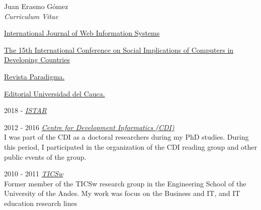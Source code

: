 \documentclass[10pt]{article}
\newenvironment{subbulletlist}{%
  \begin{list}{\labelitemii}{%
      \setlength{\topsep}{\itemsep}\setlength{\parskip}{\parsep}%
    }%
  }%
  { \end{list} }
\begin{document}
\begin{cv}{Juan Erasmo Gómez\\{\large \itshape Curriculum Vitae}}
  \begin{cvlist}{}
  \item \textbf{}
    \begin{subbulletlist}
    \item \href{https://www.emeraldgrouppublishing.com/journal/ijwis}{International Journal of Web Information Systems}
    \item \href{https://2019ifipwg94.net/}{The 15th International Conference on Social Implications of Computers in Developing Countries}
    \item \href{http://paradigma.uniandes.edu.co/}{Revista Paradigma.}
    \item \href{http://www.unicauca.edu.co/editorial/}{Editorial Universidad del Cauca.}
    \end{subbulletlist}
  \item \textbf{}

  \item[2018 - ] \textit{ \href{https://sophia.javeriana.edu.co/istar/}{ISTAR} }\\
    
  \item[2012 - 2016] \textit{\href{http://www.cdi.manchester.ac.uk/}{Centre for Development Informatics (CDI)}}\\
    {I was part of the CDI as a doctoral researchers during my PhD studies. During this period, I participated in the organization of the CDI reading group and other public events of the group.}

  \item[2010 - 2011] \textit{ \href{http://ticsw.uniandes.edu.co}{TICSw} }\\
      {Former member of the TICSw research group in the Engineering School of the University of the Andes. My work was focus on the Business and IT, and IT education research lines}


\end{cvlist}
\end{cv}
\end{document}
